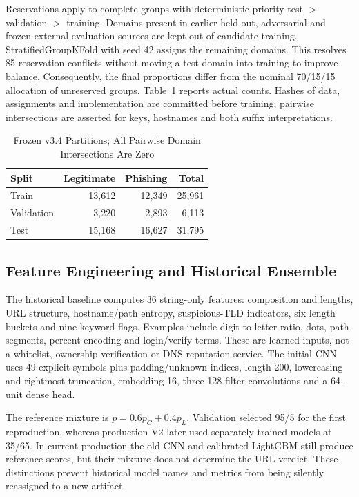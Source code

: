 \documentclass[conference,a4paper]{IEEEtran}
\begin{document}
Reservations apply to complete groups with deterministic priority test $>$ validation $>$ training. Domains present in earlier held-out, adversarial and frozen external evaluation sources are kept out of candidate training. StratifiedGroupKFold with seed 42 assigns the remaining domains. This resolves 85 reservation conflicts without moving a test domain into training to improve balance. Consequently, the final proportions differ from the nominal 70/15/15 allocation of unreserved groups. Table~\ref{tab:split} reports actual counts. Hashes of data, assignments and implementation are committed before training; pairwise intersections are asserted for keys, hostnames and both suffix interpretations.

\begin{table}[t]\centering\small
\caption{Frozen v3.4 Partitions; All Pairwise Domain Intersections Are Zero}\label{tab:split}
\begin{tabular}{lrrr}\toprule
Split & Legitimate & Phishing & Total\\\midrule
Train & 13,612 & 12,349 & 25,961\\
Validation & 3,220 & 2,893 & 6,113\\
Test & 15,168 & 16,627 & 31,795\\\bottomrule
\end{tabular}\end{table}

\subsection{Feature Engineering and Historical Ensemble}
The historical baseline computes 36 string-only features: composition and lengths, URL structure, hostname/path entropy, suspicious-TLD indicators, six length buckets and nine keyword flags. Examples include digit-to-letter ratio, dots, path segments, percent encoding and login/verify terms. These are learned inputs, not a whitelist, ownership verification or DNS reputation service. The initial CNN uses 49 explicit symbols plus padding/unknown indices, length 200, lowercasing and rightmost truncation, embedding 16, three 128-filter convolutions and a 64-unit dense head.

The reference mixture is $p=0.6p_C+0.4p_L$. Validation selected 95/5 for the first reproduction, whereas production V2 later used separately trained models at 35/65. In current production the old CNN and calibrated LightGBM still produce reference scores, but their mixture does not determine the URL verdict. These distinctions prevent historical model names and metrics from being silently reassigned to a new artifact.
\end{document}
